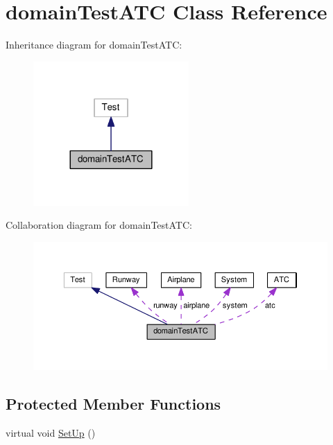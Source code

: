 \hypertarget{classdomainTestATC}{}\section{domain\+Test\+A\+TC Class Reference}
\label{classdomainTestATC}


Inheritance diagram for domain\+Test\+A\+TC\+:
\nopagebreak
\begin{figure}[H]
\begin{center}
\leavevmode
\includegraphics[width=168pt]{classdomainTestATC__inherit__graph}
\end{center}
\end{figure}


Collaboration diagram for domain\+Test\+A\+TC\+:
\nopagebreak
\begin{figure}[H]
\begin{center}
\leavevmode
\includegraphics[width=350pt]{classdomainTestATC__coll__graph}
\end{center}
\end{figure}
\subsection*{Protected Member Functions}
\begin{DoxyCompactItemize}
\item 
virtual void \hyperlink{classdomainTestATC_a699ea9550b0fab5fcaad11a17870f6b5}{Set\+Up} ()
\end{DoxyCompactItemize}
